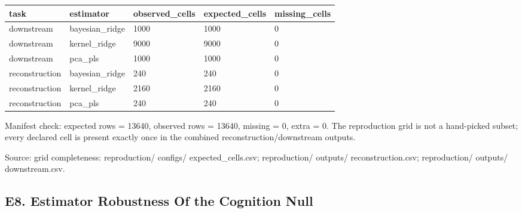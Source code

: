 {\def\LTcaptype{none} %
\begin{longtable}[]{@{}lllll@{}}
\toprule\noalign{}
task & estimator & observed\_cells & expected\_cells & missing\_cells \\
\midrule\noalign{}
\endhead
\bottomrule\noalign{}
\endlastfoot
downstream & bayesian\_ridge & 1000 & 1000 & 0 \\
downstream & kernel\_ridge & 9000 & 9000 & 0 \\
downstream & pca\_pls & 1000 & 1000 & 0 \\
reconstruction & bayesian\_ridge & 240 & 240 & 0 \\
reconstruction & kernel\_ridge & 2160 & 2160 & 0 \\
reconstruction & pca\_pls & 240 & 240 & 0 \\
\end{longtable}
}

Manifest check: expected rows = 13640, observed rows = 13640, missing = 0, extra = 0. The reproduction grid is not a hand-picked subset; every declared cell is present exactly once in the combined reconstruction/downstream outputs.

Source: grid completeness: reproduction/ configs/ expected\_cells.csv; reproduction/ outputs/ reconstruction.csv; reproduction/ outputs/ downstream.csv.

\subsection{E8. Estimator Robustness Of the Cognition Null}\label{e8-estimator-robustness-of-the-cognition-null}

